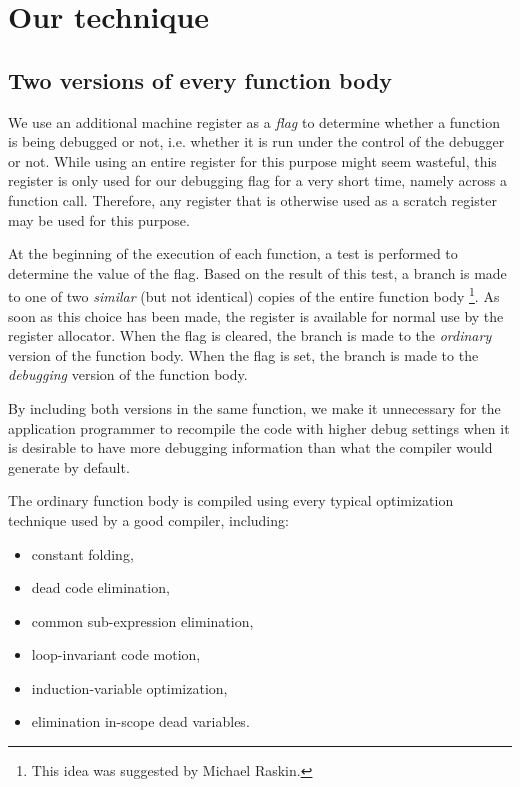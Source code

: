 \section{Our technique}
\label{sec-our-technique}

\subsection{Two versions of every function body}
\label{sec-two-body-versions}

We use an additional machine register as a \emph{flag} to determine
whether a function is being debugged or not, i.e. whether it is run
under the control of the debugger or not.  While using an entire
register for this purpose might seem wasteful, this register is only
used for our debugging flag for a very short time, namely across a
function call.  Therefore, any register that is otherwise used as a
scratch register may be used for this purpose.

At the beginning of the execution of each function, a test is
performed to determine the value of the flag.  Based on the result of
this test, a branch is made to one of two \emph{similar} (but not
identical) copies of the entire function body%
\footnote{This idea was suggested by Michael Raskin.}.  As soon as
this choice
has been made, the register is available for normal use by the
register allocator.  When the flag is cleared, the branch is made to
the \emph{ordinary} version of the function body.  When the flag is
set, the branch is made to the \emph{debugging} version of the
function body.

By including both versions in the same function, we make it
unnecessary for the application programmer to recompile the code with
higher debug settings when it is desirable to have more debugging
information than what the compiler would generate by default.

The ordinary function body is compiled using every typical optimization
technique used by a good compiler, including:

\begin{itemize}
\item constant folding,
\item dead code elimination,
\item common sub-expression elimination,
\item loop-invariant code motion,
\item induction-variable optimization, 
\item elimination in-scope dead variables.
\end{itemize}

